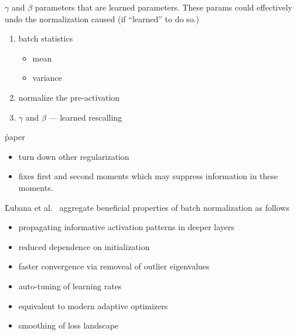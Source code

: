 \r{$\gamma$ and $\beta$ parameters that are learned parameters. These params could effectively undo the normalization caused (if ``learned'' to do so.)}


\begin{enumerate}[noitemsep,topsep=0pt]
	\item batch statistics
	\begin{itemize}[noitemsep,topsep=0pt]
		\item mean
		\item variance
	\end{itemize}
	\item normalize the pre-activation
	\item $\gamma$ and $\beta$ --- learned rescalling
\end{enumerate}




\r{paper~\cite{DBLP:journals/corr/abs-1905-02161}}
\begin{itemize}[noitemsep,topsep=0pt]
	\item turn down other regularization
	\item fixes first and second moments which may suppress information in these moments.
\end{itemize}




\r{Lubana et al.~\cite{DBLP:journals/corr/abs-2106-05956} aggregate beneficial properties of batch normalization as follows}
\begin{itemize}[noitemsep,topsep=0pt]
	\item propagating informative activation patterns in deeper layers
	\item reduced dependence on initialization
	\item faster convergence via removeal of outlier eigenvalues
	\item auto-tuning of learning rates
	\item equivalent to modern adaptive optimizers
	\item smoothing of loss landscape
\end{itemize}


